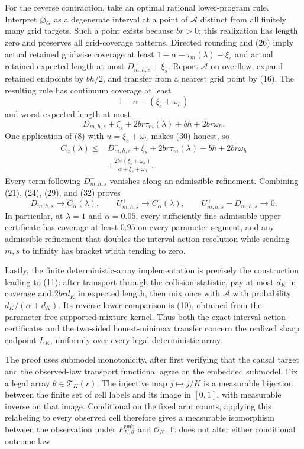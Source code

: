 For the reverse contraction, take an optimal rational lower-program rule.
Interpret \(\varnothing_G\) as a degenerate interval at a point of
\(\mathcal A\) distinct from all finitely many grid targets.  Such a point
exists because \(br>0\); this realization has length zero and preserves
all grid-coverage patterns.  Directed rounding and (26) imply actual
retained gridwise coverage at least
\(1-\alpha-\tau_m(\lambda)-\xi_s\) and actual retained expected length at
most \(D_{m,h,s}^-+\xi_s\).  Report \(\mathcal A\) on overflow, expand
retained endpoints by \(bh/2\), and transfer from a nearest grid point by
(16).  The resulting rule has continuum coverage at least
\[
 1-\alpha-(\xi_s+\omega_h)
 \tag{30}
\]
and worst expected length at most
\[
 D_{m,h,s}^-+\xi_s+2br\tau_m(\lambda)+bh+2br\omega_h.
 \tag{31}
\]
One application of (8) with \(u=\xi_s+\omega_h\) makes (30) honest, so
\[
\begin{aligned}
 C_\alpha(\lambda)
 \leq{}&D_{m,h,s}^-+\xi_s+2br\tau_m(\lambda)+bh+2br\omega_h\\
 &+\frac{2br(\xi_s+\omega_h)}
 {\alpha+\xi_s+\omega_h}.
\end{aligned}
 \tag{32}
\]
Every term following \(D_{m,h,s}^-\) vanishes along an admissible
refinement.  Combining (21), (24), (29), and (32) proves
\[
 D_{m,h,s}^-\longrightarrow C_\alpha(\lambda),\qquad
 U_{m,h,s}^+\longrightarrow C_\alpha(\lambda),\qquad
 U_{m,h,s}^+-D_{m,h,s}^-\longrightarrow0.
 \tag{33}
\]
In particular, at \(\lambda=1\) and \(\alpha=0.05\), every sufficiently
fine admissible upper certificate has coverage at least \(0.95\) on every
parameter segment, and any admissible refinement that doubles the
interval-action resolution while sending \(m,s\) to infinity has bracket
width tending to zero.

Lastly, the finite deterministic-array implementation is precisely the
construction leading to (11): after transport through the collision
statistic, pay at most \(d_K\) in coverage and \(2brd_K\) in expected
length, then mix once with \(\mathcal A\) with probability
\(d_K/(\alpha+d_K)\).  Its reverse lower comparison is (10), obtained from
the parameter-free supported-mixture kernel.  Thus both the exact
interval-action certificates and the two-sided honest-minimax transfer
concern the realized sharp endpoint \(L_K\), uniformly over every legal
deterministic array.

The proof uses submodel monotonicity, after first verifying that the causal
target and the observed-law transport functional agree on the embedded
submodel.  Fix a legal array \(\theta\in\mathcal T_K(r)\).  The injective
map \(j\mapsto j/K\) is a measurable bijection between the finite set of
cell labels and its image in \([0,1]\), with measurable inverse on that
image.  Conditional on the fixed arm counts, applying this relabeling to
every observed cell therefore gives a measurable isomorphism between the
observation under \(P_{K,\theta}^{\mathrm{emb}}\) and \(\mathcal O_K\).
It does not alter either conditional outcome law.

